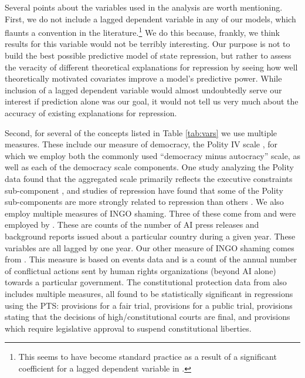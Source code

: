 \documentclass[12pt]{article}
\begin{document}
Several points about the variables used in the analysis are worth mentioning. First, we do not include a lagged dependent variable in any of our models, which flaunts a convention in the literature.\footnote{This seems to have become standard practice as a result of a significant coefficient for a lagged dependent variable in \citet{PoeTate1994}.} We do this because, frankly, we think results for this variable would not be terribly interesting. Our purpose is not to build the best possible predictive model of state repression, but rather to assess the veracity of different theoretical explanations for repression by seeing how well theoretically motivated covariates improve a model's predictive power. While inclusion of a lagged dependent variable would almost undoubtedly serve our interest if prediction alone was our goal, it would not tell us very much about the accuracy of existing explanations for repression. 

Second, for several of the concepts listed in Table \ref{tab:vars} we use multiple measures. These include our measure of democracy, the Polity IV scale \citep{MarshallJaggers2009}, for which we employ both the commonly used ``democracy minus autocracy'' scale, as well as each of the democracy scale components. One study analyzing the Polity data found that the aggregated scale primarily reflects the executive constraints sub-component \citep{GleditschWard1997}, and studies of repression have found that some of the Polity sub-components are more strongly related to repression than others \citep{Keith2002PRQ, BDMetal2005}. We also employ multiple measures of INGO shaming. Three of these come from \citet{RonRamosRodgers2005} and were employed by \citet{HafnerBurton2008}. These are counts of the number of AI press releases and background reports issued about a particular country during a given year. These variables are all lagged by one year. Our other measure of INGO shaming comes from \citet{MurdieDavis2012}. This measure is based on events data and is a count of the annual number of conflictual actions sent by human rights organizations (beyond AI alone) towards a particular government. The constitutional protection data from \citet{KeithTatePoe2009} also includes multiple measures, all found to be statistically significant in regressions using the PTS: provisions for a fair trial, provisions for a public trial, provisions stating that the decisions of high/constitutional courts are final, and provisions which require legislative approval to suspend constitutional liberties. 
\end{document}
